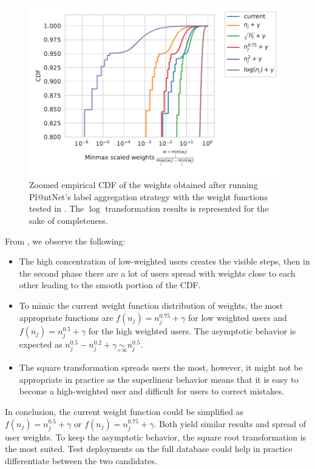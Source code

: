 \begin{figure}[htb]
    \centering
    \includegraphics[width=.75\textwidth]{./images_plantnet/cdf_weights.pdf}
    \caption{Zoomed empirical CDF of the weights obtained after running Pl@ntNet's label aggregation strategy with the weight functions tested in . The $\log$ transformation results is represented for the sake of completeness.}
    \label{fig:cdf_plantnet}
\end{figure}

From , we observe the following:
\begin{itemize}
    \item The high concentration of low-weighted users creates the visible steps, then in the second phase there are a lot of users spread with weights close to each other leading to the smooth portion of the CDF.
    \item To mimic the current weight function distribution of weights, the most appropriate functions are $f(n_j)=n_j^{0.75}+\gamma$ for low weighted users and $f(n_j)=n_j^{0.5}+\gamma$ for the high weighted users. The asymptotic behavior is expected as $n_j^{0.5} - n_j^{0.2}+\gamma  \underset{+\infty}{\sim} n_j^{0.5}$.
    \item The square transformation spreads users the most, however, it might not be appropriate in practice as the superlinear behavior means that it is easy to become a high-weighted user and difficult for users to correct mistakes.
\end{itemize}

In conclusion, the current weight function could be simplified as $f(n_j)=n_j^{0.5}+\gamma$ or $f(n_j)=n_j^{0.75}+\gamma$.
Both yield similar results and spread of user weights.
To keep the asymptotic behavior, the square root transformation is the most suited.
Test deployments on the full database could help in practice differentiate between the two candidates.

